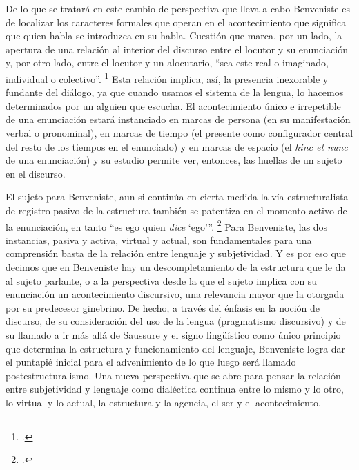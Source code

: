 De lo que se tratará en este cambio de perspectiva que lleva a cabo Benveniste es de localizar los caracteres formales que operan en el acontecimiento que significa que quien habla se introduzca en su habla. Cuestión que marca, por un lado, la apertura de una relación al interior del discurso entre el locutor y su enunciación y, por otro lado, entre el locutor y un alocutario, \enquote{sea este real o imaginado, individual o colectivo}. \footcite[][88]{@7076-BENVENISTE2008} Esta relación implica, así, la presencia inexorable y fundante del diálogo, ya que cuando usamos el sistema de la lengua, lo hacemos determinados por un alguien que escucha. El acontecimiento único e irrepetible de una enunciación estará instanciado en marcas de persona (en su manifestación verbal o pronominal), en marcas de tiempo (el presente como configurador central del resto de los tiempos en el enunciado) y en marcas de espacio (el \emph{hinc et nunc} de una enunciación) y su estudio permite ver, entonces, las huellas de un sujeto en el discurso.

El sujeto para Benveniste, aun si continúa en cierta medida la vía estructuralista de registro pasivo de la estructura  también se patentiza en el momento activo de la enunciación, en tanto \enquote{es ego quien \emph{dice} \enquote{ego}}. \footcite[][181]{@7121-BENVENISTE2010} Para Benveniste, las dos instancias, pasiva y activa, virtual y actual, son fundamentales para una comprensión basta de la relación entre lenguaje y subjetividad. Y es por eso que decimos que en Benveniste hay un descompletamiento de la estructura que le da al sujeto parlante, o a la perspectiva desde la que el sujeto implica con su enunciación un acontecimiento discursivo, una relevancia mayor que la otorgada por su predecesor ginebrino. De hecho, a través del énfasis en la noción de discurso, de su consideración del uso de la lengua (pragmatismo discursivo) y de su llamado a ir más allá de Saussure y el signo lingüístico como único principio que determina la estructura y funcionamiento del lenguaje, Benveniste logra dar el puntapié inicial para el advenimiento de lo que luego será llamado postestructuralismo. Una nueva perspectiva que se abre para pensar la relación entre subjetividad y lenguaje como dialéctica continua entre lo mismo y lo otro, lo virtual y lo actual, la estructura y la agencia, el ser y el acontecimiento.


